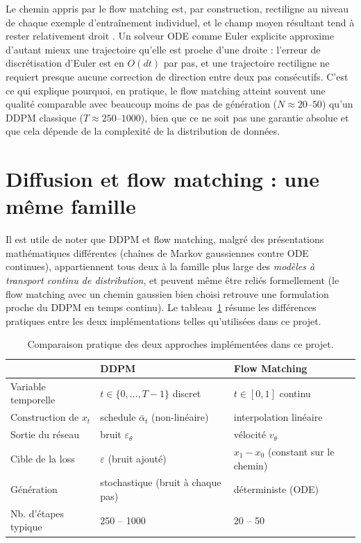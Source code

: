 Le chemin appris par le flow matching est, par construction, rectiligne au niveau de chaque exemple
d'entraînement individuel, et le champ moyen résultant tend à rester relativement \og droit \fg. Un
solveur ODE comme Euler explicite approxime d'autant mieux une trajectoire qu'elle est proche d'une
droite : l'erreur de discrétisation d'Euler est en $O(dt)$ par pas, et une trajectoire rectiligne ne
requiert presque aucune correction de direction entre deux pas consécutifs. C'est ce qui explique
pourquoi, en pratique, le flow matching atteint souvent une qualité comparable avec beaucoup moins de
pas de génération ($N \approx 20$–$50$) qu'un DDPM classique ($T \approx 250$–$1000$), bien que ce ne
soit pas une garantie absolue et que cela dépende de la complexité de la distribution de données.

\section{Diffusion et flow matching : une même famille}

Il est utile de noter que DDPM et flow matching, malgré des présentations mathématiques différentes
(chaînes de Markov gaussiennes contre ODE continues), appartiennent tous deux à la famille plus large
des \emph{modèles à transport continu de distribution}, et peuvent même être reliés formellement (le
flow matching avec un chemin gaussien bien choisi retrouve une formulation proche du DDPM en temps
continu). Le tableau~\ref{tab:comparison} résume les différences pratiques entre les deux
implémentations telles qu'utilisées dans ce projet.

\begin{table}[h]
\centering
\begin{tabular}{@{}lll@{}}
\toprule
& \textbf{DDPM} & \textbf{Flow Matching} \\
\midrule
Variable temporelle & $t \in \{0, \dots, T-1\}$ discret & $t \in [0,1]$ continu \\
Construction de $x_t$ & schedule $\bar\alpha_t$ (non-linéaire) & interpolation linéaire \\
Sortie du réseau & bruit $\varepsilon_\theta$ & vélocité $v_\theta$ \\
Cible de la loss & $\varepsilon$ (bruit ajouté) & $x_1 - x_0$ (constant sur le chemin) \\
Génération & stochastique (bruit à chaque pas) & déterministe (ODE) \\
Nb. d'étapes typique & 250 -- 1000 & 20 -- 50 \\
\bottomrule
\end{tabular}
\caption{Comparaison pratique des deux approches implémentées dans ce projet.}
\label{tab:comparison}
\end{table}
